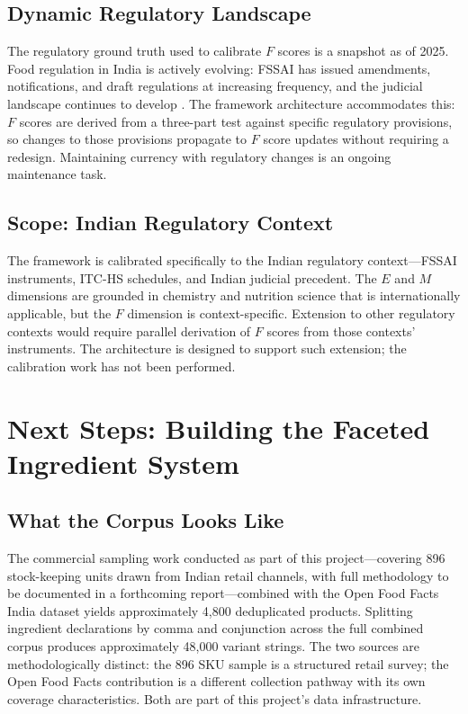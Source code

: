 \documentclass[12pt,a3paper]{article}
\begin{document}
\subsection{Dynamic Regulatory Landscape}

The regulatory ground truth used to calibrate $F$ scores is a snapshot as of 2025. Food regulation in India is actively evolving: FSSAI has issued amendments, notifications, and draft regulations at increasing frequency, and the judicial landscape continues to develop \cite{FSSAI_RegulatoryDelta}. The framework architecture accommodates this: $F$ scores are derived from a three-part test against specific regulatory provisions, so changes to those provisions propagate to $F$ score updates without requiring a redesign. Maintaining currency with regulatory changes is an ongoing maintenance task.

\subsection{Scope: Indian Regulatory Context}

The framework is calibrated specifically to the Indian regulatory context---FSSAI instruments, ITC-HS schedules, and Indian judicial precedent. The $E$ and $M$ dimensions are grounded in chemistry and nutrition science that is internationally applicable, but the $F$ dimension is context-specific. Extension to other regulatory contexts would require parallel derivation of $F$ scores from those contexts' instruments. The architecture is designed to support such extension; the calibration work has not been performed.

\newpage


\section{Next Steps: Building the Faceted Ingredient System}
\label{ch:nextsteps}

\subsection{What the Corpus Looks Like}

The commercial sampling work conducted as part of this project---covering 896 stock-keeping units drawn from Indian retail channels, with full methodology to be documented in a forthcoming report---combined with the Open Food Facts India dataset \cite{OpenFoodFacts} yields approximately 4,800 deduplicated products. Splitting ingredient declarations by comma and conjunction across the full combined corpus produces approximately 48,000 variant strings. The two sources are methodologically distinct: the 896 SKU sample is a structured retail survey; the Open Food Facts contribution is a different collection pathway with its own coverage characteristics. Both are part of this project's data infrastructure.
\end{document}
